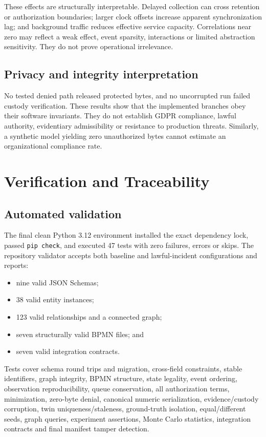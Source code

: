 ﻿\documentclass[11pt,a4paper]{article}
\newcommand{\code}[1]{\texttt{#1}}
\begin{document}
These effects are structurally interpretable. Delayed collection can cross retention or authorization boundaries; larger clock offsets increase apparent synchronization lag; and background traffic reduces effective service capacity. Correlations near zero may reflect a weak effect, event sparsity, interactions or limited abstraction sensitivity. They do not prove operational irrelevance.

\subsection{Privacy and integrity interpretation}

No tested denied path released protected bytes, and no uncorrupted run failed custody verification. These results show that the implemented branches obey their software invariants. They do not establish GDPR compliance, lawful authority, evidentiary admissibility or resistance to production threats. Similarly, a synthetic model yielding zero unauthorized bytes cannot estimate an organizational compliance rate.

\section{Verification and Traceability}

\subsection{Automated validation}

The final clean Python 3.12 environment installed the exact dependency lock, passed \code{pip check}, and executed 47 tests with zero failures, errors or skips. The repository validator accepts both baseline and lawful-incident configurations and reports:

\begin{itemize}
  \item nine valid JSON Schemas;
  \item 38 valid entity instances;
  \item 123 valid relationships and a connected graph;
  \item seven structurally valid BPMN files; and
  \item seven valid integration contracts.
\end{itemize}

Tests cover schema round trips and migration, cross-field constraints, stable identifiers, graph integrity, BPMN structure, state legality, event ordering, observation reproducibility, queue conservation, all authorization terms, minimization, zero-byte denial, canonical numeric serialization, evidence/custody corruption, twin uniqueness/staleness, ground-truth isolation, equal/different seeds, graph queries, experiment assertions, Monte Carlo statistics, integration contracts and final manifest tamper detection.
\end{document}
